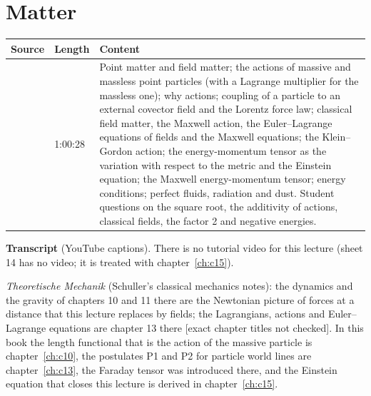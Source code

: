 \chapter{Matter}\label{ch:c14}
\begin{paracol}{2}

\begin{sources}
\begin{tabularx}{\linewidth}{@{}l l L@{}}
\toprule
\textbf{Source} & \textbf{Length} & \textbf{Content}\\
\midrule
{} & 1:00:28 & Point matter and field matter; the actions of massive and massless point particles (with a Lagrange multiplier for the massless one); why actions; coupling of a particle to an external covector field and the Lorentz force law; classical field matter, the Maxwell action, the Euler--Lagrange equations of fields and the Maxwell equations; the Klein--Gordon action; the energy-momentum tensor as the variation with respect to the metric and the Einstein equation; the Maxwell energy-momentum tensor; energy conditions; perfect fluids, radiation and dust. Student questions on the square root, the additivity of actions, classical fields, the factor 2 and negative energies.\\
\bottomrule
\end{tabularx}

\smallskip
\textbf{Transcript}  (YouTube captions). There is no tutorial video for this lecture (sheet 14 has no video; it is treated with chapter~\ref{ch:c15}).
\end{sources}

\begin{reading}
\emph{Theoretische Mechanik} (Schuller's classical mechanics notes): the dynamics and the gravity of chapters 10 and 11 there are the Newtonian picture of forces at a distance that this lecture replaces by fields; the Lagrangians, actions and Euler--Lagrange equations are chapter 13 there [exact chapter titles not checked]. In this book the length functional that is the action of the massive particle is chapter~\ref{ch:c10}, the postulates P1 and P2 for particle world lines are chapter~\ref{ch:c13}, the Faraday tensor was introduced there, and the Einstein equation that closes this lecture is derived in chapter~\ref{ch:c15}.
\end{reading}


\end{paracol}
